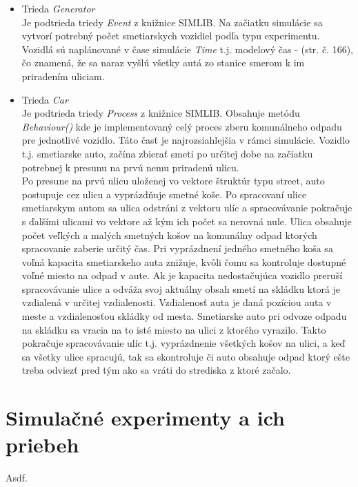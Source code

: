 \documentclass[11pt,a4paper]{article}
\begin{document}
    \begin{itemize}
        \item Trieda \textit{Generator}\\[0.1em]
              Je podtrieda triedy \textit{Event} z knižnice SIMLIB. Na začiatku simulácie sa vytvorí potrebný počet smetiarskych vozidiel podľa typu experimentu. Vozidlá sú naplánované v čase simulácie \textit{Time} t.j. modelový čas - \cite{IMS}(str. č. 166), čo znamená, že sa naraz vyšlú všetky autá zo stanice smerom k im priradením uliciam. {\color{red}{DOBA stredisko-1. ulica!}}
        \item Trieda \textit{Car}\\[0.1em]
              Je podtrieda triedy \textit{Process} z knižnice SIMLIB. Obsahuje metódu \textit{Behaviour()} kde je implementovaný celý proces zberu komunálneho odpadu pre jednotlivé vozidlo. Táto časť je najrozsiahlejšia v rámci simulácie. Vozidlo t.j. smetiarske auto, začína zbierať smeti po určitej dobe na začiatku potrebnej k presunu na prvú nemu priradenú ulicu.\\[0.3em]
              Po presune na prvú ulicu uloženej vo vektore štruktúr typu street, auto postupuje cez ulicu a vyprázdňuje smetné koše. Po spracovaní ulice smetiarskym autom sa ulica odstráni z vektoru ulíc a spracovávanie pokračuje s ďalšími ulicami vo vektore až kým ich počet sa nerovná nule. Ulica obsahuje počet veľkých a malých smetných košov na komunálny odpad ktorých spracovanie zaberie určitý čas. Pri vyprázdnení jedného smetného koša sa voľná kapacita smetiarskeho auta znižuje, kvôli čomu sa kontroluje dostupné voľné miesto na odpad v aute. Ak je kapacita nedostačujúca vozidlo preruší spracovávanie ulice a odváža svoj aktuálny obsah smetí na skládku ktorá je vzdialená v určitej vzdialenosti. Vzdialenosť auta je daná pozíciou auta v meste a vzdialenosťou skládky od mesta. Smetiarske auto pri odvoze odpadu na skládku sa vracia na to isté miesto na ulici z ktorého vyrazilo. Takto pokračuje spracovávanie ulíc t.j. vyprázdnenie všetkých košov na ulici, a keď sa všetky ulice spracujú, tak sa skontroluje či auto obsahuje odpad ktorý ešte treba odviezť pred tým ako sa vráti do strediska z ktoré začalo.
    \end{itemize}

\section{Simulačné experimenty a ich priebeh}

    Asdf.
\end{document}
